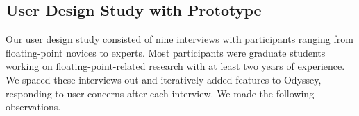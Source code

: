 



\subsection*{User Design Study with Prototype}

Our user design study consisted of nine interviews
  with participants ranging from floating-point novices to experts.
Most participants were graduate students
  working on floating-point-related research
  with at least two years of experience.
We spaced these interviews out
  and iteratively added features to Odyssey,
  responding to user concerns after each interview.
We made the following observations.

